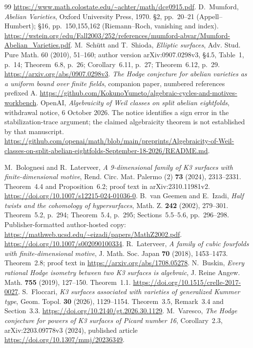 \documentclass[11pt]{article}
\theoremstyle{definition}
\theoremstyle{remark}
\newcommand{\workbenchurl}{https://github.com/KokunoYumeto/algebraic-cycles-and-motives-workbench}
\begin{document}
\begin{thebibliography}{99}
\url{https://www.math.colostate.edu/~achter/math/dcg0915.pdf}.
 D.~Mumford, \emph{Abelian Varieties},
Oxford University Press, 1970. \S2, pp.~20--21 (Appell--Humbert);
\S16, pp.~150,155,162 (Riemann--Roch, vanishing and index).
\url{https://wstein.org/edu/Fall2003/252/references/mumford-abvar/Mumford-Abelian_Varieties.pdf}.
 M.~Sch\"utt and T.~Shioda,
\emph{Elliptic surfaces}, Adv. Stud. Pure Math. 60 (2010), 51--160;
author version arXiv:0907.0298v3, \S4.5, Table~1, p.~14;
Theorem~6.8, p.~26; Corollary~6.11, p.~27; Theorem~6.12, p.~29.
\url{https://arxiv.org/abs/0907.0298v3}.
 \emph{The Hodge conjecture for abelian varieties as a uniform bound over finite fields}, companion paper, numbered references prefixed A. \url{\workbenchurl}.
 OpenAI, \emph{Algebraicity of Weil classes on split abelian eightfolds}, withdrawal notice, 6 October 2026. The notice identifies a sign error in the stabilization-trace argument; the claimed algebraicity theorem is not established by that manuscript. \url{https://github.com/openai/math/blob/main/preprints/Algebraicity-of-Weil-classes-on-split-abelian-eightfolds-September-18-2026/README.md}.

 M.~Bolognesi and R.~Laterveer,
\emph{A 9-dimensional family of K3 surfaces with finite-dimensional motive},
Rend. Circ. Mat. Palermo (2) \textbf{73} (2024), 2313--2331.
Theorem~4.4 and Proposition~6.2; proof text in arXiv:2310.11981v2.
\url{https://doi.org/10.1007/s12215-024-01036-0}.
 B.~van Geemen and E.~Izadi,
\emph{Half twists and the cohomology of hypersurfaces},
Math. Z. \textbf{242} (2002), 279--301. Theorem~5.2, p.~294;
Theorem~5.4, p.~295; Sections~5.5--5.6, pp.~296--298.
Publisher-formatted author-hosted copy:
\url{https://mathweb.ucsd.edu/~eizadi/papers/MathZ2002.pdf}.
\url{https://doi.org/10.1007/s002090100334}.
 R.~Laterveer,
\emph{A family of cubic fourfolds with finite-dimensional motive},
J. Math. Soc. Japan \textbf{70} (2018), 1453--1473.
Theorem~2.8; proof text in \url{https://arxiv.org/abs/1708.05278}.
 N.~Buskin,
\emph{Every rational Hodge isometry between two K3 surfaces is algebraic},
J. Reine Angew. Math. \textbf{755} (2019), 127--150. Theorem~1.1.
\url{https://doi.org/10.1515/crelle-2017-0027}.
 S.~Floccari,
\emph{K3 surfaces associated with varieties of generalized Kummer type},
Geom. Topol. \textbf{30} (2026), 1129--1154.
Theorem~3.5, Remark~3.4 and Section~3.3.
\url{https://doi.org/10.2140/gt.2026.30.1129}.
 M.~Varesco,
\emph{The Hodge conjecture for powers of K3 surfaces of Picard number 16},
Corollary~2.3, arXiv:2203.09778v3 (2024), published article
\url{https://doi.org/10.1307/mmj/20236349}.


\end{thebibliography}
\end{document}
